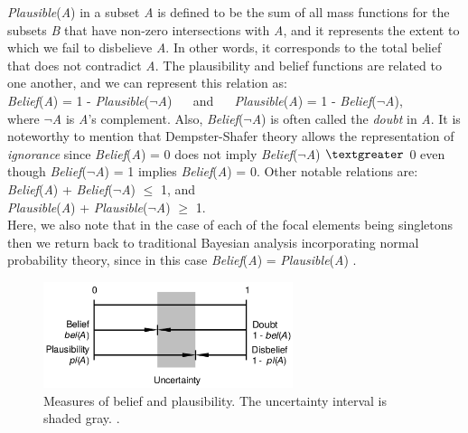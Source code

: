 \documentclass[11pt]{article}
\begin{document}
\noindent \textit{Plausible}(\textit{A}) in a subset \textit{A} is defined to
be the sum of all mass functions for the subsets \textit{B} that have non-zero
intersections with \textit{A}, and it represents the extent to which we fail to
disbelieve \textit{A}. In other words, it corresponds to the total belief that
does not contradict \textit{A}. The plausibility and belief functions are
related to one another, and we can represent this relation as:\\

\noindent\textit{Belief}(\textit{A}) = 1 -
\textit{Plausible}(\textit{$\neg$A}) $\quad$ and $\quad$
\textit{Plausible}(\textit{A}) = 1 - \textit{Belief}(\textit{$\neg$A}),\\

\noindent where \textit{$\neg$A} is \textit{A}'s complement. Also,
\textit{Belief}(\textit{$\neg$A}) is often called the \textit{doubt} in
\textit{A}. It is noteworthy to mention that Dempster-Shafer theory allows the
representation of \textit{ignorance} since \textit{Belief}(\textit{A}) = 0 does
not imply \textit{Belief}(\textit{$\neg$A}) $\textgreater$ 0 even though
\textit{Belief}(\textit{$\neg$A}) = 1 implies \textit{Belief}(\textit{A}) = 0. Other
notable relations are:\\

\noindent\textit{Belief}(\textit{A}) + \textit{Belief}(\textit{$\neg$A}) $\leq$ 1,
and\\

\noindent\textit{Plausible}(\textit{A}) +
\textit{Plausible}(\textit{$\neg$A}) $\geq$ 1.\\

Here, we also note that in the case of each of the focal elements being
singletons then we return back to traditional Bayesian analysis incorporating
normal probability theory, since in this case \textit{Belief}(\textit{A}) =
\textit{Plausible}(\textit{A}) \cite{beynon:dst-alternative-decision}.

\begin{figure}[tbh]
  \center
  \includegraphics[width=0.65\textwidth]{figure/uncertainty.png}
  \caption{Measures of belief and plausibility. The uncertainty interval is
  shaded gray. \cite{kay:dst-reliability}.}
  \label{fig:uncertainty}
\end{figure}
\end{document}
